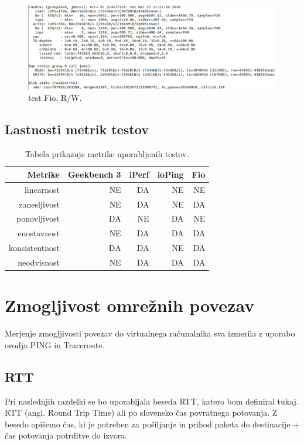 \begin{figure}[H]
    \centering
    \includegraphics[scale=0.4]{Img/fio1.png}
    \caption{test Fio, R/W.}
    \label{fig:6_fio1}
\end{figure}

\subsection{Lastnosti metrik testov}

\begin{table}[H]
    \centering
        \begin{tabular}{ | r | r | r | r | r |} 
            \hline
            Metrike & Geekbench 3 & iPerf & ioPing & Fio  \\
            \hline
            linearnost & NE & DA & NE & NE \\
            zanesljivost & NE & DA & NE & DA  \\
            ponovljivost & DA & NE & DA & NE  \\
            enostavnost & NE & DA & DA & DA  \\
            konsistentnost & DA & DA & NE & DA  \\
            neodvisnost & NE & DA & DA & DA  \\
            \hline
        \end{tabular}
        \caption{Tabela prikazuje metrike uporabljenih testov.}
    \label{table:1_chunks}
\end{table}



\section{Zmogljivost omrežnih povezav}

Merjenje zmogljivosti povezav do virtualnega računalnika sva izmerila z uporabo orodja PING in Traceroute.

\subsection{RTT}
Pri naslednjih razdelki se bo uporabljala beseda RTT, katero bom definiral tukaj. RTT (angl. Round Trip Time) ali po slovensko čas povratnega potovanja. Z besedo opišemo čas, ki je potreben za pošiljanje in prihod paketa do destinacije + čas potovanja potrditve do izvora.

